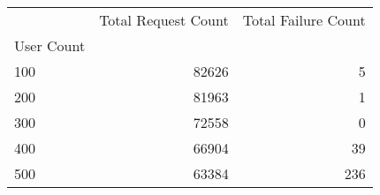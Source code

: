 \begin{tabular}{lrr}
\toprule
 & Total Request Count & Total Failure Count \\
User Count &  &  \\
\midrule
100 & 82626 & 5 \\
200 & 81963 & 1 \\
300 & 72558 & 0 \\
400 & 66904 & 39 \\
500 & 63384 & 236 \\
\bottomrule
\end{tabular}
